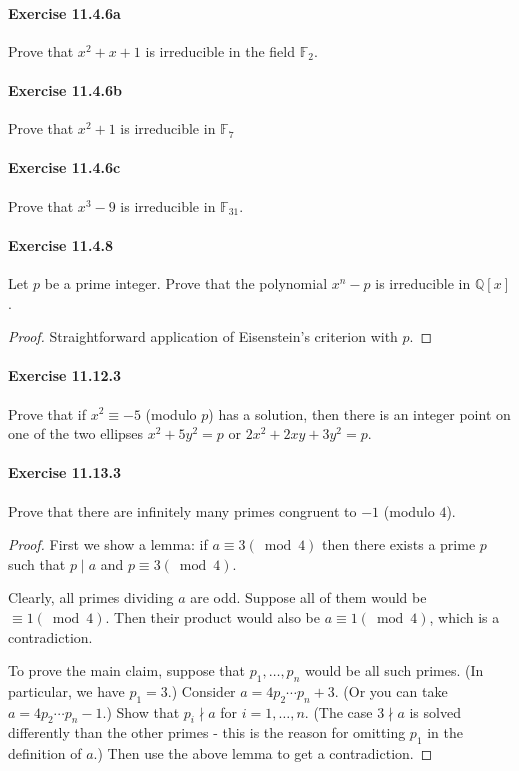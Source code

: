 \documentclass{article}
\begin{document}
\paragraph{Exercise 11.4.6a} Prove that $x^2+x+1$ is irreducible in the field $\mathbb{F}_2$.

\paragraph{Exercise 11.4.6b} Prove that $x^2+1$ is irreducible in $\mathbb{F}_7$


\paragraph{Exercise 11.4.6c} Prove that $x^3 - 9$ is irreducible in $\mathbb{F}_{31}$.


\paragraph{Exercise 11.4.8} Let $p$ be a prime integer. Prove that the polynomial $x^n-p$ is irreducible in $\mathbb{Q}[x]$.
\begin{proof}
   Straightforward application of Eisenstein's criterion with $p$.  
\end{proof}



\paragraph{Exercise 11.12.3} Prove that if $x^2 \equiv-5$ (modulo $p$) has a solution, then there is an integer point on one of the two ellipses $x^2+5 y^2=p$ or $2 x^2+2 x y+3 y^2=p$.


\paragraph{Exercise 11.13.3} Prove that there are infinitely many primes congruent to $-1$ (modulo $4$).
\begin{proof}
    First we show a lemma: if $a \equiv 3(\bmod 4)$ then there exists a prime $p$ such that $p \mid a$ and $p \equiv 3(\bmod 4)$.

    Clearly, all primes dividing $a$ are odd. Suppose all of them would be $\equiv 1(\bmod 4)$. Then their product would also be $a \equiv 1(\bmod 4)$, which is a contradiction.

To prove the main claim, suppose that $p_1, \ldots, p_n$ would be all such primes. (In particular, we have $p_1=3$.) Consider $a=4 p_2 \cdots p_n+3$. (Or you can take $a=4 p_2 \cdots p_n-1$.) Show that $p_i \nmid a$ for $i=1, \ldots, n$. (The case $3 \nmid a$ is solved differently than the other primes - this is the reason for omitting $p_1$ in the definition of $a$.) Then use the above lemma to get a contradiction.
\end{proof}
\end{document}
